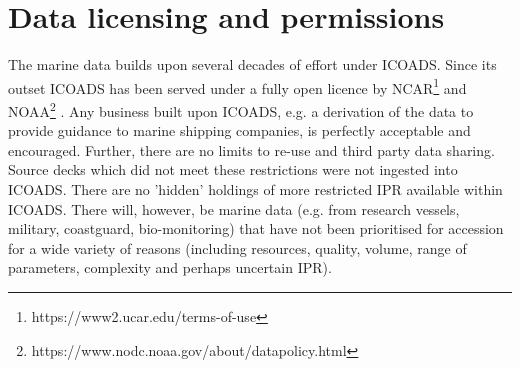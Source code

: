 \section{Data licensing and permissions}
The marine data builds upon several decades of effort under ICOADS. Since its outset ICOADS has been served under a fully open licence by NCAR\footnote{https://www2.ucar.edu/terms-of-use} and NOAA\footnote{https://www.nodc.noaa.gov/about/datapolicy.html} . Any business built upon ICOADS, e.g. a derivation of the data to provide guidance to marine shipping companies, is perfectly acceptable and encouraged. Further, there are no limits to re-use and third party data sharing. Source decks which did not meet these restrictions were not ingested into ICOADS. There are no 'hidden' holdings of more restricted IPR available within ICOADS. There will, however, be marine data (e.g. from research vessels, military, coastguard, bio-monitoring) that have not been prioritised for accession for a wide variety of reasons (including resources, quality, volume, range of parameters, complexity and perhaps uncertain IPR).
